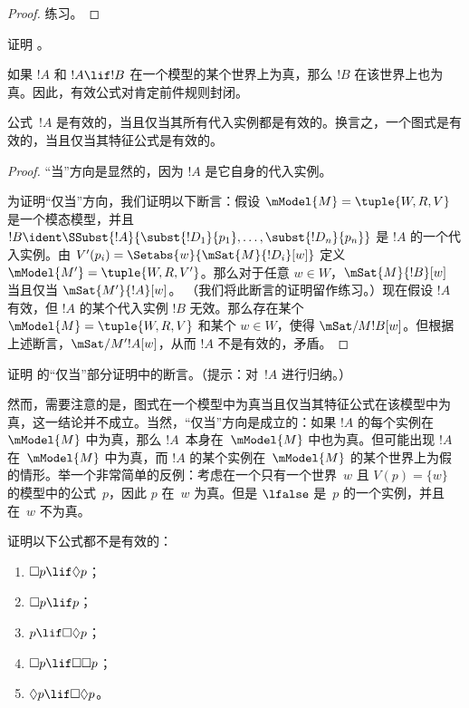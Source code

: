 \documentclass[../../../include/open-logic-section]{subfiles}
\begin{document}
\begin{proof}
  练习。
\end{proof}

\begin{prob}
  证明 。
\end{prob}

\begin{prop}
  如果 $!A$ 和 $!A \lif !B$ 在一个模型的某个世界上为真，那么 $!B$ 在该世界上也为真。因此，有效公式对肯定前件规则封闭。
\end{prop}

\begin{prop}
  公式~$!A$ 是有效的，当且仅当其所有代入实例都是有效的。换言之，一个图式是有效的，当且仅当其特征公式是有效的。
\end{prop}

\begin{proof}
  “当”方向是显然的，因为 $!A$ 是它自身的代入实例。

  为证明“仅当”方向，我们证明以下断言：假设 $\mModel{M} = \tuple{W, R, V}$ 是一个模态模型，并且 $!B \ident
  \SSubst{!A}{\subst{!D_1}{p_1},\dots,\subst{!D_n}{p_n}}$ 是
  $!A$ 的一个代入实例。由 $V'(p_i) = \Setabs{w}{\mSat{M}{!D_i}[w]}$ 定义 $\mModel{M'} = \tuple{W, R,
    V'}$。那么对于任意 $w \in W$，$\mSat{M}{!B}[w]$ 当且仅当 $\mSat{M'}{!A}[w]$。
  （我们将此断言的证明留作练习。）现在假设 $!A$ 有效，但 $!A$ 的某个代入实例 $!B$ 无效。那么存在某个 $\mModel{M} = \tuple{W, R, V}$ 和某个 $w \in W$，使得
  $\mSat/{M}{!B}[w]$。但根据上述断言，$\mSat/{M'}{!A}[w]$，从而 $!A$ 不是有效的，矛盾。
\end{proof}

\begin{prob}
  证明  的“仅当”部分证明中的断言。（提示：对~$!A$ 进行归纳。）
\end{prob}

然而，需要注意的是，图式在一个模型中为真当且仅当其特征公式在该模型中为真，这一结论并不成立。当然，“仅当”方向是成立的：如果 $!A$ 的每个实例在~$\mModel{M}$ 中为真，那么 $!A$~本身在~$\mModel{M}$ 中也为真。但可能出现 $!A$ 在~$\mModel{M}$ 中为真，而 $!A$ 的某个实例在~$\mModel{M}$ 的某个世界上为假的情形。举一个非常简单的反例：考虑在一个只有一个世界~$w$ 且 $V(p) = \{w\}$ 的模型中的公式~$p$，因此 $p$ 在~$w$ 为真。但是 $\lfalse$ 是~$p$ 的一个实例，并且在~$w$ 不为真。

\begin{prob}
  证明以下公式都不是有效的：
  \begin{enumerate}
    \item[\Ax{D}:] \quad $\Box p \lif \Diamond p$；
    \item[\Ax{T}:] \quad $\Box p \lif p$；
    \item[\Ax{B}:] \quad $p \lif \Box\Diamond p$；
    \item[\Ax{4}:] \quad $\Box p \lif \Box \Box p$；
    \item[\Ax{5}:] \quad $\Diamond p \lif \Box \Diamond
      p$。
  \end{enumerate}
\end{prob}
\end{document}
